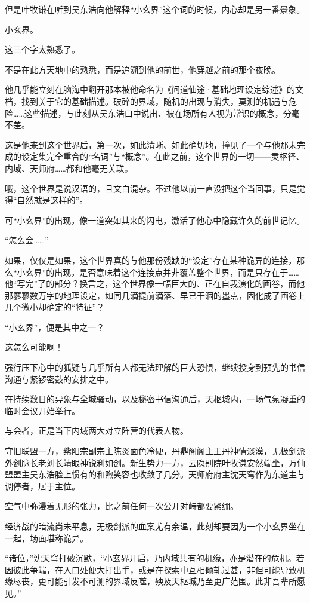 但是叶牧谦在听到吴东浩向他解释“小玄界”这个词的时候，内心却是另一番景象。

小玄界。

这三个字太熟悉了。

不是在此方天地中的熟悉，而是追溯到他的前世，他穿越之前的那个夜晚。

他几乎能立刻在脑海中翻开那本被他命名为《问道仙途·基础地理设定综述》的文档，找到关于它的基础描述。破碎的界域，随机的出现与消失，莫测的机遇与危险……这些描述，与此刻从吴东浩口中说出、被在场所有人视为常识的概念，分毫不差。

这是他来到这个世界后，第一次，如此清晰、如此确切地，撞见了一个与他那未完成的设定集完全重合的“名词”与“概念”。在此之前，这个世界的一切——灵枢径、内域、天师府……都和他毫无关联。

哦，这个世界是说汉语的，且文白混杂。不过他以前一直没把这个当回事，只是觉得“自然就是这样的”。

可“小玄界”的出现，像一道突如其来的闪电，激活了他心中隐藏许久的前世记忆。

“怎么会……”

如果，仅仅是如果，这个世界真的与他那份残缺的“设定”存在某种诡异的连接，那么“小玄界”的出现，是否意味着这个连接点并非覆盖整个世界，而是只存在于……他“写完”了的部分？换言之，这个世界像一幅巨大的、正在自我演化的画卷，而他那寥寥数万字的地理设定，如同几滴提前滴落、早已干涸的墨点，固化成了画卷上几个微小却确定的“特征”？

“小玄界”，便是其中之一？

这怎么可能啊！

强行压下心中的狐疑与几乎所有人都无法理解的巨大恐惧，继续投身到预先的书信沟通与紧锣密鼓的安排之中。

\vspace{2em}

在持续数日的异象与全城骚动，以及秘密书信沟通后，天枢城内，一场气氛凝重的临时会议开始举行。

与会者，正是当下内域两大对立阵营的代表人物。

守旧联盟一方，紫阳宗副宗主陈炎面色冷硬，丹鼎阁阁主王丹神情淡漠，无极剑派外剑脉长老刘长靖眼神锐利如剑。新生势力一方，云隐别院叶牧谦安然端坐，万仙盟盟主吴东浩脸上惯有的和煦笑容也收敛了几分。天师府府主沈天穹作为东道主与调停者，居于主位。

空气中弥漫着无形的张力，比之前任何一次公开对峙都要紧绷。

经济战的暗流尚未平息，无极剑派的血案尤有余温，此刻却要因为一个小玄界坐在一起，场面堪称诡异。

“诸位，”沈天穹打破沉默，“小玄界开启，乃内域共有的机缘，亦是潜在的危机。若因彼此争端，在入口处便大打出手，或是在探索中互相倾轧过甚，非但可能导致机缘尽丧，更可能引发不可测的界域反噬，殃及天枢城乃至更广范围。此非吾辈所愿见。”

